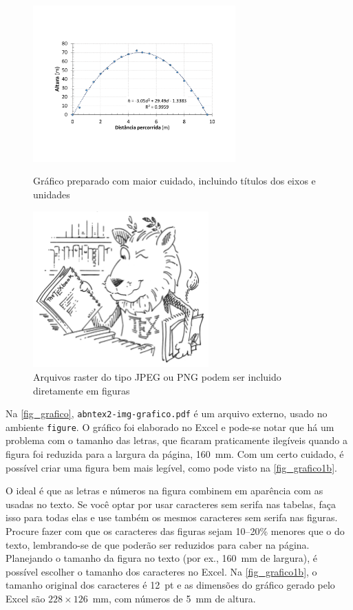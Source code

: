 \begin{figure}\sffamily
	\begin{center}
	    \includegraphics[height=60mm]{cap1/grafico1b.pdf}
	\end{center}
	\vspace{-12pt} %
	\caption{Gráfico preparado com maior cuidado, incluindo títulos dos eixos
	e unidades}
	\label{fig_grafico1b}
	\centering
	\includegraphics[height=60mm]{cap1/tex_lion_600.png}
	\caption{Arquivos raster do tipo JPEG ou PNG podem
	ser incluido diretamente em figuras}
	\label{f:lion}
\end{figure}



Na \autoref{fig_grafico}, \texttt{abntex2-img-grafico.pdf}  é um  arquivo 
externo, usado no ambiente \texttt{figure}. O gráfico foi elaborado no Excel
e pode-se notar que há um problema com o tamanho das letras, que ficaram
praticamente ilegíveis quando a figura foi reduzida para a largura da página,
160~mm. Com um certo cuidado, é possível criar uma figura bem mais legível, 
como pode visto na \autoref{fig_grafico1b}. 

O ideal é que as letras e números
na figura combinem em aparência com as usadas no texto. Se você 
optar por usar caracteres sem serifa nas tabelas, faça isso para todas elas
e use também os mesmos caracteres sem serifa nas figuras. Procure fazer
com que os caracteres das figuras sejam 10--20\% menores que o do texto, 
lembrando-se de que poderão ser reduzidos para caber na página. Planejando
o tamanho da figura no texto (por ex., 160~mm de largura), é possível escolher
o tamanho dos caracteres no Excel. Na  \autoref{fig_grafico1b}, o tamanho 
original dos caracteres é 12~pt e as dimensões do gráfico gerado pelo Excel são 
$228 \times 126$~mm, com números de 5~mm de altura.


